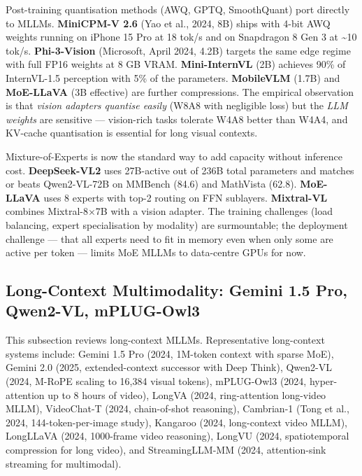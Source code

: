 \documentclass{article}
\begin{document}
Post-training quantisation methods (AWQ, GPTQ, SmoothQuant) port directly to MLLMs. \textbf{MiniCPM-V 2.6} (Yao et al., 2024, 8B) ships with 4-bit AWQ weights running on iPhone 15 Pro at 18 tok/s and on Snapdragon 8 Gen 3 at \textasciitilde10 tok/s. \textbf{Phi-3-Vision} (Microsoft, April 2024, 4.2B) targets the same edge regime with full FP16 weights at 8 GB VRAM. \textbf{Mini-InternVL} (2B) achieves 90\% of InternVL-1.5 perception with 5\% of the parameters. \textbf{MobileVLM} (1.7B) and \textbf{MoE-LLaVA} (3B effective) are further compressions. The empirical observation is that \emph{vision adapters quantise easily} (W8A8 with negligible loss) but the \emph{LLM weights} are sensitive --- vision-rich tasks tolerate W4A8 better than W4A4, and KV-cache quantisation is essential for long visual contexts.

Mixture-of-Experts is now the standard way to add capacity without inference cost. \textbf{DeepSeek-VL2} \citep{wu20242024} uses 27B-active out of 236B total parameters and matches or beats Qwen2-VL-72B on MMBench (84.6) and MathVista (62.8). \textbf{MoE-LLaVA} uses 8 experts with top-2 routing on FFN sublayers. \textbf{Mixtral-VL} combines Mixtral-8×7B with a vision adapter. The training challenges (load balancing, expert specialisation by modality) are surmountable; the deployment challenge --- that all experts need to fit in memory even when only some are active per token --- limits MoE MLLMs to data-centre GPUs for now.

\subsection{Long-Context Multimodality: Gemini 1.5 Pro, Qwen2-VL, mPLUG-Owl3}\label{long-context-multimodality-gemini-1.5-pro-qwen2-vl-mplug-owl3}

This subsection reviews long-context MLLMs. Representative long-context systems include: Gemini 1.5 Pro (2024, 1M-token context with sparse MoE), Gemini 2.0 (2025, extended-context successor with Deep Think), Qwen2-VL (2024, M-RoPE scaling to 16,384 visual tokens), mPLUG-Owl3 (2024, hyper-attention up to 8 hours of video), LongVA (2024, ring-attention long-video MLLM), VideoChat-T (2024, chain-of-shot reasoning), Cambrian-1 (Tong et al., 2024, 144-token-per-image study), Kangaroo (2024, long-context video MLLM), LongLLaVA (2024, 1000-frame video reasoning), LongVU (2024, spatiotemporal compression for long video), and StreamingLLM-MM (2024, attention-sink streaming for multimodal).
\end{document}
